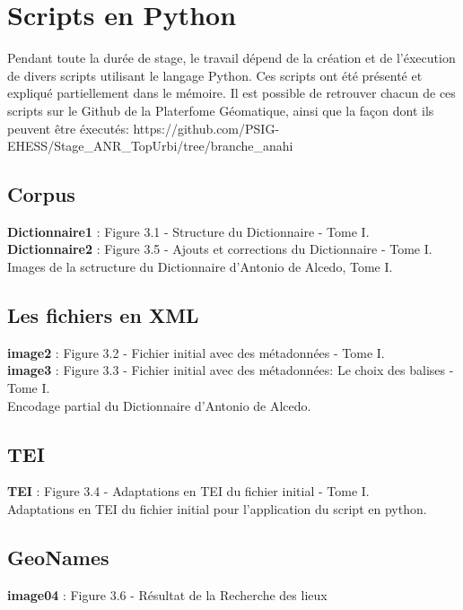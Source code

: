 \documentclass[a4paper,12pt,twoside]{book}
\begin{document}


	\appendix
	\chapter{Scripts en Python}
	
	Pendant toute la durée de stage, le travail dépend de la création et de l'éxecution de divers scripts utilisant le langage Python. Ces scripts ont été présenté et expliqué partiellement dans le mémoire. Il est possible de retrouver chacun de ces scripts sur le Github de la Platerfome Géomatique, ainsi que la façon dont ils peuvent être éxecutés: https://github.com/PSIG-EHESS/Stage\_ANR\_TopUrbi/tree/branche\_anahi
	
	
		\section{Corpus}
		\noindent \textbf{Dictionnaire1} : Figure 3.1 - Structure du Dictionnaire - Tome I.  \\
		\textbf{Dictionnaire2} : Figure 3.5 - Ajouts et corrections du Dictionnaire - Tome I.\\
		
		Images de la sctructure du Dictionnaire d'Antonio de Alcedo, Tome I.
	
		\section{Les fichiers en XML}
		\noindent \textbf{image2} : Figure 3.2 - Fichier initial avec des métadonnées - Tome I. \\
		\textbf{image3} : Figure 3.3 - Fichier initial avec des métadonnées: Le choix des balises - Tome I. \\
		
		Encodage partial du Dictionnaire d'Antonio de Alcedo.
		
	\section{TEI}
\noindent \textbf{TEI} : Figure 3.4 - Adaptations en TEI du fichier initial - Tome I. \\
	
	Adaptations en TEI du fichier initial pour l'application du script en python.
	
	\section{GeoNames}
\noindent \textbf{image04} : Figure 3.6 - Résultat de la Recherche des lieux\\
	
\end{document}

